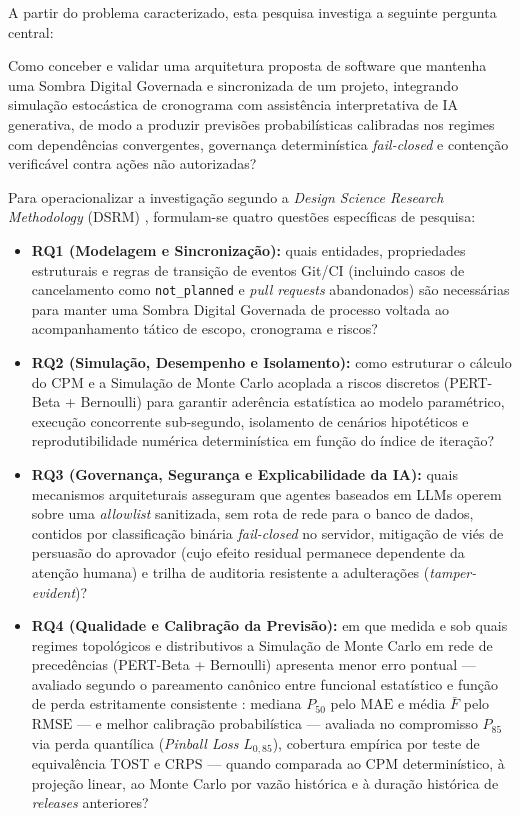 \documentclass[12pt,openany,oneside,a4paper,english,brazilian,sumario=tradicional]{abntex2}
\begin{document}
A partir do problema caracterizado, esta pesquisa investiga a seguinte pergunta central:

\begin{citacao}
Como conceber e validar uma arquitetura proposta de software que mantenha uma Sombra Digital Governada e sincronizada de um projeto, integrando simulação estocástica de cronograma com assistência interpretativa de IA generativa, de modo a produzir previsões probabilísticas calibradas nos regimes com dependências convergentes, governança determinística \textit{fail-closed} e contenção verificável contra ações não autorizadas?
\end{citacao}

Para operacionalizar a investigação segundo a \textit{Design Science Research Methodology} (DSRM) \cite{peffers2007}, formulam-se quatro questões específicas de pesquisa:

\begin{itemize}
  \item \textbf{RQ1 (Modelagem e Sincronização):} quais entidades, propriedades estruturais e regras de transição de eventos Git/CI (incluindo casos de cancelamento como \texttt{not\_planned} e \textit{pull requests} abandonados) são necessárias para manter uma Sombra Digital Governada de processo voltada ao acompanhamento tático de escopo, cronograma e riscos?
  \item \textbf{RQ2 (Simulação, Desempenho e Isolamento):} como estruturar o cálculo do CPM e a Simulação de Monte Carlo acoplada a riscos discretos (PERT-Beta + Bernoulli) para garantir aderência estatística ao modelo paramétrico, execução concorrente sub-segundo, isolamento de cenários hipotéticos e reprodutibilidade numérica determinística em função do índice de iteração?
  \item \textbf{RQ3 (Governança, Segurança e Explicabilidade da IA):} quais mecanismos arquiteturais asseguram que agentes baseados em LLMs operem sobre uma \textit{allowlist} sanitizada, sem rota de rede para o banco de dados, contidos por classificação binária \textit{fail-closed} no servidor, mitigação de viés de persuasão do aprovador (cujo efeito residual permanece dependente da atenção humana) e trilha de auditoria resistente a adulterações (\textit{tamper-evident})?
  \item \textbf{RQ4 (Qualidade e Calibração da Previsão):} em que medida e sob quais regimes topológicos e distributivos a Simulação de Monte Carlo em rede de precedências (PERT-Beta + Bernoulli) apresenta menor erro pontual — avaliado segundo o pareamento canônico entre funcional estatístico e função de perda estritamente consistente \cite{gneiting2011}: mediana $P_{50}$ pelo $\mathrm{MAE}$ e média $\bar{F}$ pelo $\mathrm{RMSE}$ — e melhor calibração probabilística — avaliada no compromisso $P_{85}$ via perda quantílica (\textit{Pinball Loss} $L_{0{,}85}$), cobertura empírica por teste de equivalência TOST \cite{schuirmann1987} e $\mathrm{CRPS}$ — quando comparada ao CPM determinístico, à projeção linear, ao Monte Carlo por vazão histórica \cite{vacanti2015} e à duração histórica de \textit{releases} anteriores?
\end{itemize}
\end{document}
